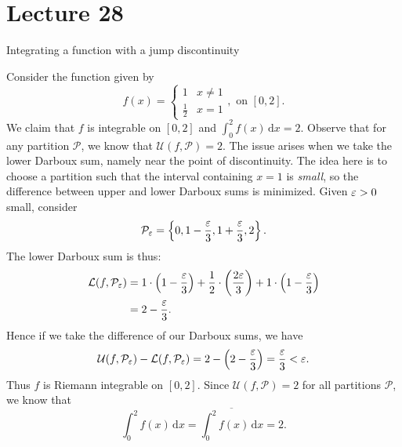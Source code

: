 \documentclass[class=article, crop=false]{standalone}
\begin{document}
  \section{Lecture 28}
  \begin{example}{Integrating a function with a jump discontinuity} \par
    Consider the function given by
    \[
      f(x) = \begin{cases}1 & x\neq 1 \\ \frac{1}{2} & x = 1\end{cases}, \text{ on } [0, 2].
    \]
    We claim that $f$ is integrable on $[0, 2]$ and $\int_{0}^{2}f(x) \,\mathrm dx = 2$. Observe that for any partition $\mathcal{P}$, we know that $\mathcal{U}(f, \mathcal{P}) = 2$. The issue arises when we take the lower Darboux sum, namely near the point of discontinuity. The idea here is to choose a partition such that the interval containing $x = 1$ is \emph{small}, so the difference between upper and lower Darboux sums is minimized. Given $\varepsilon > 0$ small, consider
    \[
      \mathcal{P}_{\varepsilon} = \left\{0, 1 - \frac{\varepsilon}{3}, 1 + \frac{\varepsilon}{3}, 2\right\}.
    \]
    The lower Darboux sum is thus:
    \begin{align*}
      \mathcal{L}(f, \mathcal{P}_{\varepsilon}) &= 1\cdot \left( 1 - \frac{\varepsilon}{3} \right) + \frac{1}{2}\cdot \left( \frac{2\varepsilon}{3} \right) + 1\cdot \left( 1 - \frac{\varepsilon}{3} \right) \\
                                       &= 2 - \frac{\varepsilon}{3}.
    \end{align*}
    Hence if we take the difference of our Darboux sums, we have
    \[
      \mathcal{U}(f, \mathcal{P}_{\varepsilon}) - \mathcal{L}(f, \mathcal{P}_{\varepsilon}) = 2 - \left( 2 - \frac{\varepsilon}{3} \right) = \frac{\varepsilon}{3} < \varepsilon.
    \]
    Thus $f$ is Riemann integrable on $[0, 2]$. Since $\mathcal{U}(f, \mathcal{P}) = 2$ for all partitions $\mathcal{P}$, we know that
    \[
      \int_{0}^{2}f(x) \,\mathrm dx = \overline{\int_{0}^{2}f(x) \,\mathrm dx} = 2.
    \]
  \end{example}
\end{document}
